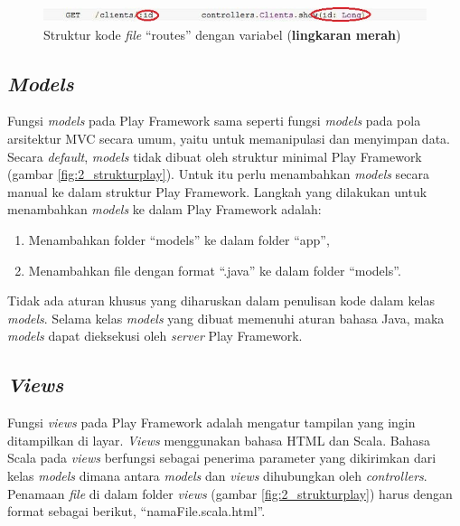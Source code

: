 \begin{figure}[htbp]
	\centering
		\includegraphics[scale=0.8]{Gambar/2_routes3.JPG}
	\caption{Struktur kode \textit{file} ``routes'' dengan variabel\cite{playframeworkrouting2} (\textbf{lingkaran merah})}
	\label{fig:2_routes3}
\end{figure}

\subsection{\textit{Models}}
\label{sec:models}
Fungsi \textit{models} pada Play Framework sama seperti fungsi \textit{models} pada pola arsitektur MVC secara umum, yaitu untuk memanipulasi dan menyimpan data. Secara \textit{default}, \textit{models} tidak dibuat oleh struktur minimal Play Framework (gambar \ref{fig:2_strukturplay}). Untuk itu perlu menambahkan \textit{models} secara manual ke dalam struktur Play Framework. Langkah yang dilakukan untuk menambahkan \textit{models} ke dalam Play Framework adalah:
\begin{enumerate}
	\item Menambahkan folder ``models'' ke dalam folder ``app'',
	\item Menambahkan file dengan format ``.java'' ke dalam folder ``models''.
\end{enumerate}

Tidak ada aturan khusus yang diharuskan dalam penulisan kode dalam kelas \textit{models}. Selama kelas \textit{models} yang dibuat memenuhi aturan bahasa Java, maka \textit{models} dapat dieksekusi oleh \textit{server} Play Framework.

\subsection{\textit{Views}}
\label{sec:views}
Fungsi \textit{views} pada Play Framework adalah mengatur tampilan yang ingin ditampilkan di layar. \textit{Views} menggunakan bahasa HTML dan Scala. Bahasa Scala pada \textit{views} berfungsi sebagai penerima parameter yang dikirimkan dari kelas \textit{models} dimana antara \textit{models} dan \textit{views} dihubungkan oleh \textit{controllers}. Penamaan \textit{file} di dalam folder \textit{views} (gambar \ref{fig:2_strukturplay}) harus dengan format sebagai berikut, ``namaFile.scala.html''.

